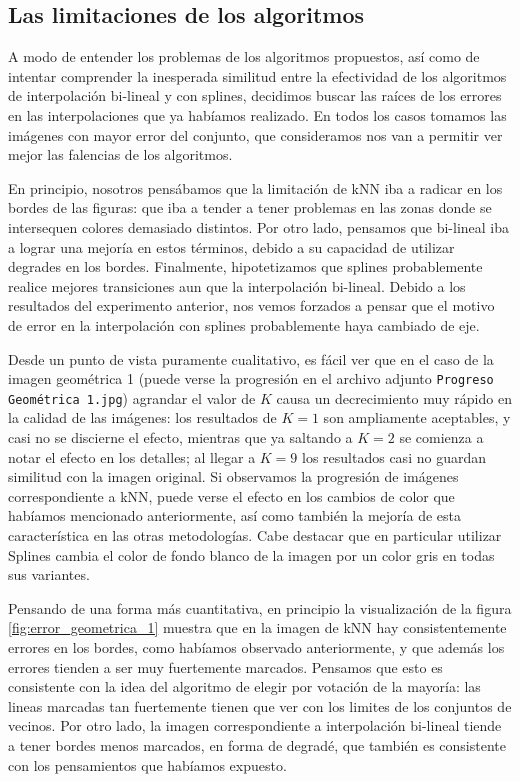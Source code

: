 \documentclass{article}
\begin{document}
\subsection{Las limitaciones de los algoritmos}

A modo de entender los problemas de los algoritmos propuestos, así como de intentar comprender la inesperada similitud entre la efectividad de los algoritmos de interpolación bi-lineal y con splines, decidimos buscar las raíces de los errores en las interpolaciones que ya habíamos realizado. En todos los casos tomamos las imágenes con mayor error del conjunto, que consideramos nos van a permitir ver mejor las falencias de los algoritmos. 

En principio, nosotros pensábamos que la limitación de kNN iba a radicar en los bordes de las figuras: que iba a tender a tener problemas en las zonas donde se intersequen colores demasiado distintos. Por otro lado, pensamos que bi-lineal iba a lograr una mejoría en estos términos, debido a su capacidad de utilizar degrades en los bordes. Finalmente, hipotetizamos que splines probablemente realice mejores transiciones aun que la interpolación bi-lineal. Debido a los resultados del experimento anterior, nos vemos forzados a pensar que el motivo de error en la interpolación con splines probablemente haya cambiado de eje.

Desde un punto de vista puramente cualitativo, es fácil ver que en el caso de la imagen geométrica 1 (puede verse la progresión en el archivo adjunto \texttt{Progreso Geométrica 1.jpg}) agrandar el valor de $K$ causa un decrecimiento muy rápido en la calidad de las imágenes: los resultados de $K=1$ son ampliamente aceptables, y casi no se discierne el efecto, mientras que ya saltando a $K=2$ se comienza a notar el efecto en los detalles; al llegar a $K=9$ los resultados casi no guardan similitud con la imagen original. Si observamos la progresión de imágenes correspondiente a kNN, puede verse el efecto en los cambios de color que habíamos mencionado anteriormente, así como también la mejoría de esta característica en las otras metodologías. Cabe destacar que en particular utilizar Splines cambia el color de fondo blanco de la imagen por un color gris en todas sus variantes.

Pensando de una forma más cuantitativa, en principio la visualización de la figura \ref{fig:error_geometrica_1} muestra que en la imagen de kNN hay consistentemente errores en los bordes, como habíamos observado anteriormente, y que además los errores tienden a ser muy fuertemente marcados. Pensamos que esto es consistente con la idea del algoritmo de elegir por votación de la mayoría: las lineas marcadas tan fuertemente tienen que ver con los limites de los conjuntos de vecinos. Por otro lado, la imagen correspondiente a interpolación bi-lineal tiende a tener bordes menos marcados, en forma de degradé, que también es consistente con los pensamientos que habíamos expuesto.
\end{document}
